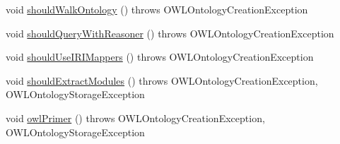 \begin{DoxyCompactItemize}
void \hyperlink{classorg_1_1coode_1_1owlapi_1_1examples_1_1_examples_a8d10838c853d93908c615c0db202f002}{should\-Walk\-Ontology} ()  throws O\-W\-L\-Ontology\-Creation\-Exception 
\item 
void \hyperlink{classorg_1_1coode_1_1owlapi_1_1examples_1_1_examples_a88fedeeeaaeaa4f54eea581d9177964f}{should\-Query\-With\-Reasoner} ()  throws O\-W\-L\-Ontology\-Creation\-Exception 
\item 
void \hyperlink{classorg_1_1coode_1_1owlapi_1_1examples_1_1_examples_ae55ab0a4eeee04ce82c5e73172acf569}{should\-Use\-I\-R\-I\-Mappers} ()  throws O\-W\-L\-Ontology\-Creation\-Exception 
\item 
void \hyperlink{classorg_1_1coode_1_1owlapi_1_1examples_1_1_examples_a7527848ffe148d4ad7ec15920a17a415}{should\-Extract\-Modules} ()  throws O\-W\-L\-Ontology\-Creation\-Exception,             O\-W\-L\-Ontology\-Storage\-Exception 
\item 
void \hyperlink{classorg_1_1coode_1_1owlapi_1_1examples_1_1_examples_a77aa09ee1b2badafaaaef4f997c4f840}{owl\-Primer} ()  throws O\-W\-L\-Ontology\-Creation\-Exception,             O\-W\-L\-Ontology\-Storage\-Exception 
\end{DoxyCompactItemize}
